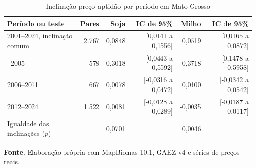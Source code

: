 \begin{table}[htbp]
\centering
\footnotesize
\setlength{\tabcolsep}{4pt}
\captionstyle{\centering}
\normalcaption
\caption{Inclinação preço--aptidão por período em Mato Grosso}
\label{tab:h1-regimes-alinhados}
\begin{tabular}{lrrrrr}
\toprule
Período ou teste & Pares & Soja & IC de 95\% & Milho & IC de 95\% \\
\midrule
2001--2024, inclinação comum & 2.767 & 0,0848 & [0,0141 a 0,1556] & 0,0519 & [0,0165 a 0,0872] \\
\addlinespace
2001--2005 & 578 & 0,3018 & [0,0443 a 0,5592] & 0,3718 & [0,1478 a 0,5958] \\
2006--2011 & 667 & 0,0078 & [-0,0316 a 0,0472] & 0,0100 & [-0,0342 a 0,0542] \\
2012--2024 & 1.522 & 0,0081 & [-0,0128 a 0,0289] & -0,0035 & [-0,0187 a 0,0117] \\
\midrule
Igualdade das inclinações ($p$) &  & 0,0701 &  & 0,0046 &  \\
\bottomrule
\end{tabular}
\par\smallskip\begin{minipage}{\textwidth}\footnotesize
\SingleSpacing
\noindent\textbf{Fonte}. Elaboração própria com MapBiomas 10.1, GAEZ v4 e séries de preços reais.
\end{minipage}
\end{table}
